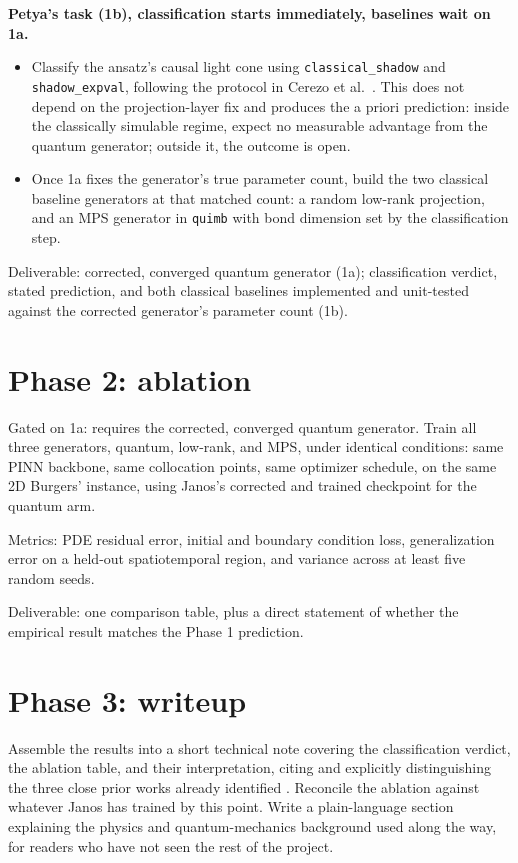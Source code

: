 \documentclass[10pt,a4paper]{article}
\begin{document}
\textbf{Petya's task (1b), classification starts immediately, baselines wait on 1a.}
\begin{itemize}
\item Classify the ansatz's causal light cone using \texttt{classical\_shadow} and \texttt{shadow\_expval}, following the protocol in Cerezo et al.\ \cite{cerezo2025}. This does not depend on the projection-layer fix and produces the a priori prediction: inside the classically simulable regime, expect no measurable advantage from the quantum generator; outside it, the outcome is open.
\item Once 1a fixes the generator's true parameter count, build the two classical baseline generators at that matched count: a random low-rank projection, and an MPS generator in \texttt{quimb} with bond dimension set by the classification step.
\end{itemize}

Deliverable: corrected, converged quantum generator (1a); classification verdict, stated prediction, and both classical baselines implemented and unit-tested against the corrected generator's parameter count (1b).

\section{Phase 2: ablation}

Gated on 1a: requires the corrected, converged quantum generator. Train all three generators, quantum, low-rank, and MPS, under identical conditions: same PINN backbone, same collocation points, same optimizer schedule, on the same 2D Burgers' instance, using Janos's corrected and trained checkpoint for the quantum arm.

Metrics: PDE residual error, initial and boundary condition loss, generalization error on a held-out spatiotemporal region, and variance across at least five random seeds.

Deliverable: one comparison table, plus a direct statement of whether the empirical result matches the Phase 1 prediction.

\section{Phase 3: writeup}

Assemble the results into a short technical note covering the classification verdict, the ablation table, and their interpretation, citing and explicitly distinguishing the three close prior works already identified \cite{liu2025typhoon,zabihi2026,linghu2026}. Reconcile the ablation against whatever Janos has trained by this point. Write a plain-language section explaining the physics and quantum-mechanics background used along the way, for readers who have not seen the rest of the project.
\end{document}
